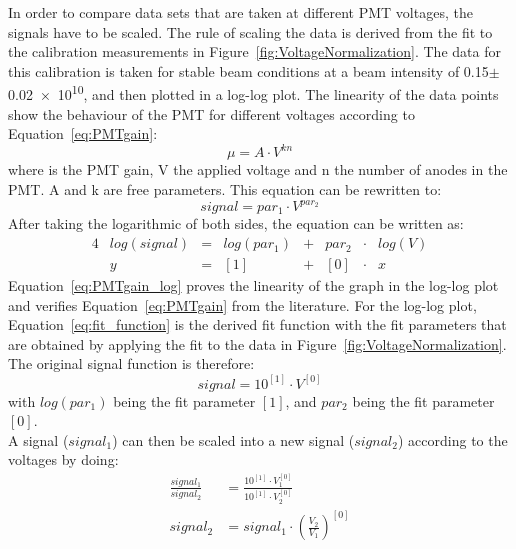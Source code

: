 In order to compare data sets that are taken at different PMT voltages, the signals have to be scaled. The rule of scaling the data is derived from the fit to the calibration measurements in Figure~\ref{fig:VoltageNormalization}. The data for this calibration is taken for stable beam conditions at a beam intensity of \num{0.15}$\pm$\num{0.02e10}, and then plotted in a log-log plot. The linearity of the data points show the behaviour of the PMT for different voltages according to Equation~\ref{eq:PMTgain}\cite{Hamamatsu}:
\begin{equation}
 \mu = A \cdot V^{kn} 
 \label{eq:PMTgain}
\end{equation}
where \textmu is the PMT gain, V the applied voltage and n the number of anodes in the PMT. A and k are free parameters. This equation can be rewritten to:
\begin{equation}
 signal = par_1 \cdot V^{par_2}
 \label{eq:PMTgain_simple}
\end{equation}
After taking the logarithmic of both sides, the equation can be written as:
\begin{alignat}{4}
 & log(signal) & = & log(par_1) & + & par_2 & \cdot &log(V) \label{eq:PMTgain_log} \\
 & y & = & [1] & + & [0] & \cdot & x \label{eq:fit_function}
\end{alignat}
Equation~\ref{eq:PMTgain_log} proves the linearity of the graph in the log-log plot and verifies Equation~\ref{eq:PMTgain} from the literature. For the log-log plot, Equation~\ref{eq:fit_function} is the derived fit function with the fit parameters that are obtained by applying the fit to the data in Figure~\ref{fig:VoltageNormalization}. The original signal function is therefore:
\begin{equation}
 signal = 10^{[1]} \cdot V^{[0]}
 \label{eq:PMTgain_simple_fitparameters}
\end{equation}
with $log(par_1)$ being the fit parameter $[1]$, and $par_2$ being the fit parameter $[0]$.\\
A signal ($signal_1$) can then be scaled into a new signal ($signal_2$) according to the voltages by doing:
\begin{align}
 \frac{signal_1}{signal_2} & = \frac{10^{[1]}\cdot V_1^{[0]}}{10^{[1]}\cdot V_2^{[0]}} \\
 signal_2 & = signal_1 \cdot \left( \frac{V_2}{V_1} \right) ^{[0]}
\end{align}


